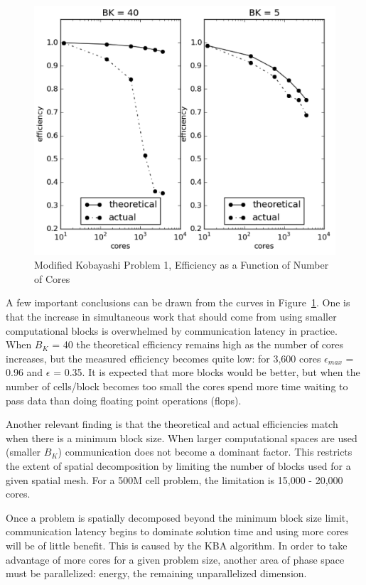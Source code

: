 \begin{figure}[!h]
  \begin{center}
    \includegraphics [width=.9\textwidth, height=0.5\textheight ] {JagBlockStudy}
  \end{center}
  \caption{Modified Kobayashi Problem 1, Efficiency as a Function of Number of Cores}
  \label{fig:JagBlockStudy}
\end{figure}

A few important conclusions can be drawn from the curves in Figure~\ref{fig:JagBlockStudy}. One is that the increase in simultaneous work that should come from using smaller computational blocks is overwhelmed by communication latency in practice. When $B_{K}$ = 40 the theoretical efficiency remains high as the number of cores increases, but the measured efficiency becomes quite low: for 3,600 cores $\epsilon_{max}$ = 0.96 and $\epsilon$ = 0.35. It is expected that more blocks would be better, but when the number of cells/block becomes too small the cores spend more time waiting to pass data than doing floating point operations (flops). 

Another relevant finding is that the theoretical and actual efficiencies match when there is a minimum block size. When larger computational spaces are used (smaller $B_{K}$) communication does not become a dominant factor. This restricts the extent of spatial decomposition by limiting the number of blocks used for a given spatial mesh. For a 500M cell problem, the limitation is 15,000 - 20,000 cores. 

Once a problem is spatially decomposed beyond the minimum block size limit, communication latency begins to dominate solution time and using more cores will be of little benefit. This is caused by the KBA algorithm. In order to take advantage of more cores for a given problem size, another area of phase space must be parallelized: energy, the remaining unparallelized dimension. 


